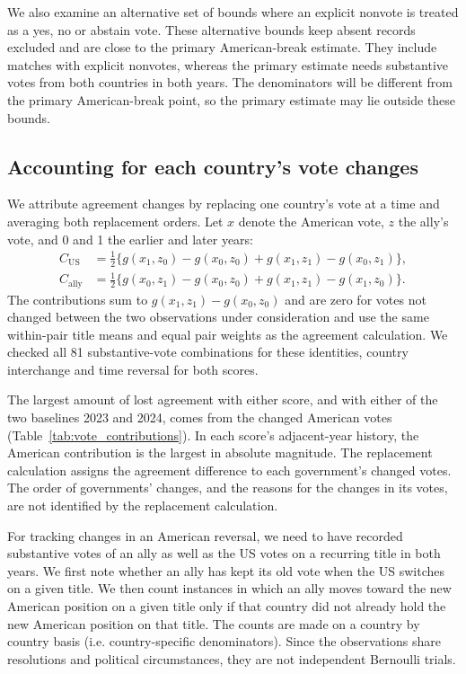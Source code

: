 \documentclass[10pt,authoryear]{elsarticle}
\begin{document}
We also examine an alternative set of bounds where an explicit nonvote is treated as a yes, no or abstain vote. These alternative bounds keep absent records excluded and are close to the primary American-break estimate. They include matches with explicit nonvotes, whereas the primary estimate needs substantive votes from both countries in both years. The denominators will be different from the primary American-break point, so the primary estimate may lie outside these bounds.





\subsection{Accounting for each country's vote changes}

We attribute agreement changes by replacing one country's vote at a time and averaging both replacement orders. Let $x$ denote the American vote, $z$ the ally's vote, and 0 and 1 the earlier and later years:
\[
\begin{aligned}
C_{\mathrm{US}}&=\tfrac12\{g(x_1,z_0)-g(x_0,z_0)+g(x_1,z_1)-g(x_0,z_1)\},\\
C_{\mathrm{ally}}&=\tfrac12\{g(x_0,z_1)-g(x_0,z_0)+g(x_1,z_1)-g(x_1,z_0)\}.
\end{aligned}
\]
The contributions sum to $g(x_1,z_1)-g(x_0,z_0)$ and are zero for votes not changed between the two observations under consideration and use the same within-pair title means and equal pair weights as the agreement calculation. We checked all 81 substantive-vote combinations for these identities, country interchange and time reversal for both scores.

The largest amount of lost agreement with either score, and with either of the two baselines 2023 and 2024, comes from the changed American votes (Table~\ref{tab:vote_contributions}). In each score’s adjacent-year history, the American contribution is the largest in absolute magnitude. The replacement calculation assigns the agreement difference to each government’s changed votes. The order of governments’ changes, and the reasons for the changes in its votes, are not identified by the replacement calculation.

For tracking changes in an American reversal, we need to have recorded substantive votes of an ally as well as the US votes on a recurring title in both years. We first note whether an ally has kept its old vote when the US switches on a given title. We then count instances in which an ally moves toward the new American position on a given title only if that country did not already hold the new American position on that title. The counts are made on a country by country basis (i.e. country-specific denominators). Since the observations share resolutions and political circumstances, they are not independent Bernoulli trials.
\end{document}
